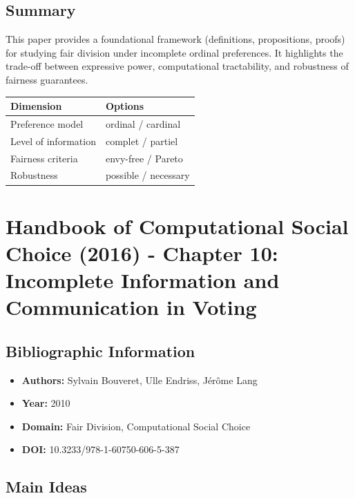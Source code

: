 \documentclass[12pt,a4paper]{article}
\begin{document}
\subsection*{Summary}
This paper provides a foundational framework (definitions, propositions, proofs) for studying fair division under incomplete ordinal preferences. It highlights the trade-off between expressive power, computational tractability, and robustness of fairness guarantees.
\begin{center}
\begin{tabular}{ll}
\toprule
\textbf{Dimension} & \textbf{Options} \\
\midrule
Preference model & ordinal / cardinal \\
Level of information & complet / partiel \\
Fairness criteria & envy-free / Pareto \\
Robustness & possible / necessary \\
\bottomrule
\end{tabular}
\end{center}

\section{Handbook of Computational Social Choice (2016) - Chapter 10: Incomplete Information and Communication in Voting }
\label{sec:article2}


\subsection*{Bibliographic Information}
\begin{itemize}
    \item \textbf{Authors:} Sylvain Bouveret, Ulle Endriss, Jérôme Lang
    \item \textbf{Year:} 2010
    \item \textbf{Domain:} Fair Division, Computational Social Choice
    \item \textbf{DOI:} 10.3233/978-1-60750-606-5-387
\end{itemize}

\subsection*{Main Ideas}
\begin{tcolorbox}[colback=blue!5!white, colframe=blue!50!black]

\end{tcolorbox}
\end{document}
